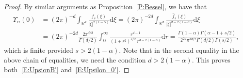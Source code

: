 \documentclass[sn-mathphys]{sn-jnl}%
\newcommand{\BR}{\mathbb{R}}
\newcommand{\ud}{\ensuremath{\mathrm{d}}}
\numberwithin{equation}{section}
\theoremstyle{thmstyleone}%
\theoremstyle{thmstyletwo}%
\theoremstyle{thmstylethree}%
\begin{document}
\begin{proof}
  By similar arguments as Proposition~\ref{P:Bessel}, we have that
	\begin{align*}
     \Upsilon_{\alpha}(0)
     & = (2\pi)^{-d} \int_{\BR^d} \frac{f_s(\xi)}{\lvert\xi\rvert^{2(1-\alpha)}} \ud \xi
       = (2\pi)^{-2d} \int_{\BR^d} \frac{\widehat{f}_s(\xi)}{\lvert\xi\rvert^{d-2(1-\alpha)}} \ud \xi                                                               \\
     & = (2\pi)^{-2d} \frac{2 \pi^{d/2}}{\Gamma\left(d/2\right)} \int_0^\infty \frac{r^{d-1}}{ \left(1+r^2\right)^{s / 2} \: r^{d - 2(1-\alpha)} } \ud r
       = \frac{\Gamma\left(1 - \alpha\right) \Gamma\left(\alpha - 1 + s/2\right)}{2^{2d} \pi^{3d/2} \Gamma(d/2)\Gamma\left(s/2\right) },
	\end{align*}
  which is finite provided $s>2(1-\alpha)$. Note that in the second equality in the above chain of
  equalities, we need the condition $d>2(1-\alpha)$. This proves both~\eqref{E:UpsionB'}
  and~\eqref{E:Upsilon_0'}.


\end{proof}
\end{document}
